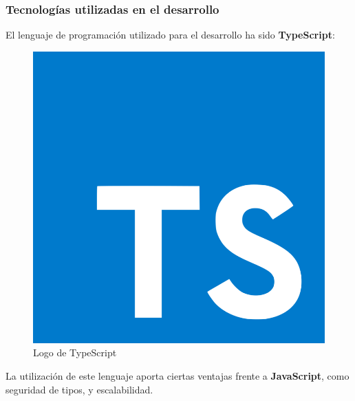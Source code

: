 \documentclass{beamer}
\begin{document}
\begin{frame}
\frametitle{Tecnologías utilizadas en el desarrollo}

El lenguaje de programación utilizado para el desarrollo ha sido \textbf{TypeScript}:

\medskip

\begin{figure}
    \centering
    \includegraphics[scale=0.1]{mem/images/cap-4/4.1.2(desarrollo)/typescript-logo.png}
    \caption{Logo de TypeScript}
    \label{fig:typescript}
\end{figure}

\medskip

La utilización de este lenguaje aporta ciertas ventajas frente a \textbf{JavaScript}, como seguridad de tipos, y escalabilidad. 

\end{frame}
\end{document}
